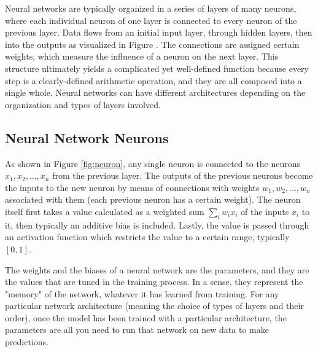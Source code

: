 \documentclass[12pt]{article}
\begin{document}
Neural networks are typically organized in a series of layers of many neurons, where each individual neuron of one layer is connected to every neuron of the previous layer. Data flows from an initial input layer, through hidden layers, then into the outputs as visualized in Figure \cite{fig:example-nn}. The connections are assigned certain weights, which measure the influence of a neuron on the next layer. This structure ultimately yields a complicated yet well-defined function because every step is a clearly-defined arithmetic operation, and they are all composed into a single whole. Neural networks can have different architectures depending on the organization and types of layers involved.

\subsection{Neural Network Neurons}

As shown in Figure \ref{fig:neuron}, any single neuron is connected to the neurons $x_1, x_2, ..., x_n$ from the previous layer. The outputs of the previous neurons become the inputs to the new neuron by means of connections with weights $w_1, w_2, ..., w_n$ associated with them (each previous neuron has a certain weight). The neuron itself first takes a value calculated as a weighted sum $\sum_i w_i x_i$ of the inputs $x_i$ to it, then typically an additive bias is included. Lastly, the value is passed through an activation function which restricts the value to a certain range, typically $[0,1]$. 

The weights and the biases of a neural network are the parameters, and they are the values that are tuned in the training process. In a sense, they represent the "memory" of the network, whatever it has learned from training. For any particular network architecture (meaning the choice of types of layers and their order), once the model has been trained with a particular architecture, the parameters are all you need to run that network on new data to make predictions. 
\end{document}
